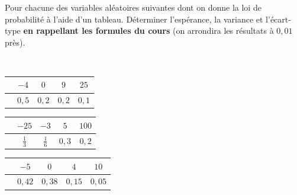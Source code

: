 \documentclass[main.tex]{subfiles}
\begin{document}
\begin{exercise}
	Pour chacune des variables aléatoires suivantes dont on donne la loi de probabilité à l'aide d'un tableau. Déterminer l'espérance, la variance et l'écart-type \textbf{	en rappellant les formules du cours} (on arrondira les résultats à $0,01$ près).
	
	\medskip
	\noindent\renewcommand{\arraystretch}{1.5}
	\ \begin{tabular}{|c|c|c|c|c|}
		\hline
		\cellcolor{blue!10}{$x_i$} & $-4$ & $0$ & $9$ & $25$ \\\hline
		\cellcolor{blue!10}{\scriptsize$P(X=x_i)$} & $0,5$ & $0,2$ & $0,2$ & $0,1$\\\hline
	\end{tabular} 
		\renewcommand{\arraystretch}{1.5}
		 \begin{tabular}{|c|c|c|c|c|}
			\hline
			\cellcolor{blue!10}{$x_i$} & $-25$ & $-3$ & $5$ & $100$ \\\hline
			\cellcolor{blue!10}{\scriptsize$P(Y=x_i)$} & $\frac{1}{3}$ & $\frac{1}{6}$ & $0,3$ & $0,2$\\\hline
		\end{tabular}  
		\renewcommand{\arraystretch}{1.5}
		 \begin{tabular}{|c|c|c|c|c|}
			\hline 	
				\cellcolor{blue!10}{$x_i$} & $-5$ & $0$ & $4$ & $10$ \\\hline
			\cellcolor{blue!10}{\scriptsize$P(Z=x_i)$} & $0,42$ & $0,38$ & $0,15$ & $0,05$\\\hline
		\end{tabular} 
	\smallskip
\end{exercise}
\end{document}
